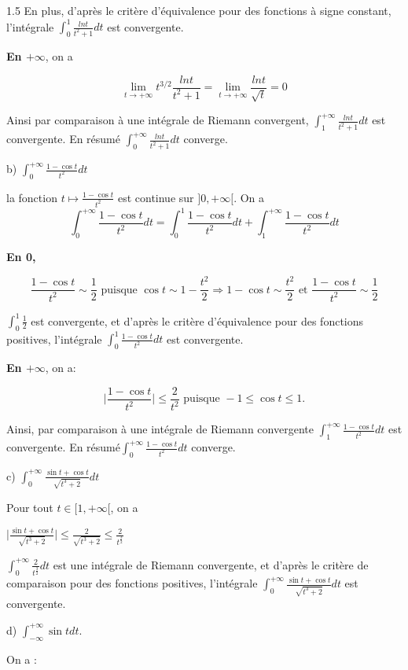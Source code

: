 \documentclass[12pt]{article}
\begin{document}
\begin{spacing}{1.5}
 En plus, d'après le critère d'équivalence pour des fonctions à signe constant, l'intégrale $\int_0^{1}\frac{lnt}{t^2+1}dt$ est convergente.

\medskip\textbf{En $+\infty$}, on a

\[\lim_{t\to +\infty}t^{3/2}\frac{lnt}{t^2+1}=\lim_{t\to +\infty}\frac{lnt}{\sqrt{t}}=0\]

Ainsi par comparaison à une intégrale de Riemann convergent, $\int_1^{+\infty}\frac{lnt}{t^2+1}dt$ est convergente. En résumé $\int_0^{+\infty}\frac{lnt}{t^2+1}dt$ converge.

\medskip 
b) $\int_0^{+\infty}\frac{1-\cos t}{t^2}dt$

 la fonction $t\mapsto \frac{1-\cos t}{t^2}$ est continue sur $]0, +\infty[$. On a 
 \[\int_0^{+\infty}\frac{1-\cos t}{t^2}dt=\int_0^{1}\frac{1-\cos t}{t^2}dt+\int_1^{+\infty}\frac{1-\cos t}{t^2}dt\]
 
 \textbf{En 0,}
 
 \[\frac{1-\cos t}{t^2}\sim \frac{1}{2} \text{ puisque } \cos t\sim 1-\frac{t^2}{2}\Rightarrow 1-\cos t\sim \frac{t^2}{2} \text{ et } \frac{1-\cos t}{t^2}\sim \frac{1}{2} \]
 
 $\int_0^{1}\frac{1}{2}$ est convergente, et d'après le critère d'équivalence pour des fonctions positives, l'intégrale $\int_0^{1}\frac{1-\cos t}{t^2}dt$ est convergente.
 
 \textbf{En $+\infty$}, on a:
 
 \[\mid \frac{1-\cos t}{t^2}\mid \leqslant \frac{2}{t^2} \text{ puisque } -1\leqslant \cos t\leqslant 1 .\]
 
 Ainsi, par comparaison à une intégrale de Riemann convergente $\int_1^{+\infty}\frac{1-\cos t}{t^2}dt$ est convergente. En résumé$\int_0^{+\infty}\frac{1-\cos t}{t^2}dt$ converge.
 
 \medskip c) $\int_0^{+\infty}\frac{\sin t+\cos t}{\sqrt{t^3+2}}dt$ 
 
 Pour tout $t\in [1, +\infty[$, on a
 
 $\mid\frac{\sin t+\cos t}{\sqrt{t^3+2}}\mid\leqslant\frac{2}{\sqrt{t^3+2}}\leqslant\frac{2}{t^{\frac{3}{2}}}$
 
 $\int_0^{+\infty}\frac{2}{t^{\frac{3}{2}}}dt$ est une intégrale de Riemann convergente, et d'après le critère de comparaison pour des fonctions positives, l'intégrale  $\int_0^{+\infty}\frac{\sin t+\cos t}{\sqrt{t^3+2}}dt$ est convergente.
 
\medskip d) $\int_{-\infty}^{+\infty}\sin t dt$.

On a :


\end{spacing}
\end{document}
